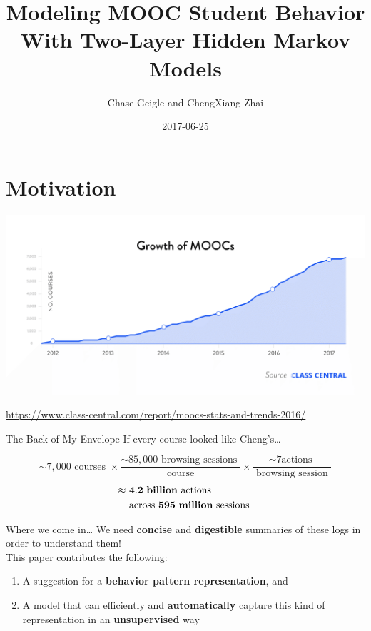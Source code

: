 \documentclass[10pt]{beamer}
\title{Modeling MOOC Student Behavior With Two-Layer Hidden Markov Models}
\author{Chase Geigle and ChengXiang Zhai}
\institute{Department of Computer Science, University of Illinois at
Urbana-Champaign}
\date{2017-06-25}
\begin{document}
\maketitle

\section{Motivation}

\begin{frame}
  \begin{center}
      \includegraphics[width=\textwidth]{figures/Growth-of-MOOCs.png}

      \small{\url{https://www.class-central.com/report/moocs-stats-and-trends-2016/}}
  \end{center}
\end{frame}

\begin{frame}{The Back of My Envelope}
  If every course looked like Cheng's\ldots
  \begin{center}
      \[
        \sim 7,000\text{ courses } \times \frac{\sim 85,000\text{ browsing
        sessions }}{\text{ course }} \times \frac{\sim 7\text{
        actions }}{\text{ browsing session }}
      \]
      \Large
      \begin{align*}
        \approx &\text{ } \mathbf{4.2} \text{ \textbf{billion} actions }
        \\
        &\text{ across } \mathbf{595} \text{ \textbf{million} sessions }
      \end{align*}
  \end{center}
\end{frame}

\begin{frame}{Where we come in\ldots}
    We need \textbf{\alert{concise}} and \textbf{\alert{digestible}}
    summaries of these logs in order to understand them!
    \\[\baselineskip]
    This paper contributes the following:
    \begin{enumerate}
      \item A suggestion for a \textbf{behavior pattern representation}, and
      \item A model that can efficiently and \textbf{automatically} capture
          this kind of representation in an \textbf{unsupervised} way
    \end{enumerate}
\end{frame}
\end{document}
